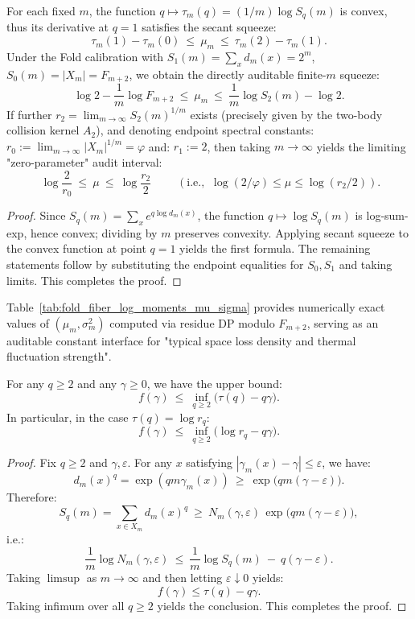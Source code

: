 \begin{corollary}\label{cor:pom-mu-secant-audit}
For each fixed $m$, the function $q\mapsto \tau_m(q)=(1/m)\log S_q(m)$ is convex, thus its derivative at $q=1$ satisfies the secant squeeze:
\[
\boxed{\;
\tau_m(1)-\tau_m(0)\ \le\ \mu_m\ \le\ \tau_m(2)-\tau_m(1).\;}
\]
Under the Fold calibration with $S_1(m)=\sum_x d_m(x)=2^m$, $S_0(m)=|X_m|=F_{m+2}$, we obtain the directly auditable finite-$m$ squeeze:
\[
\boxed{\;
\log2-\frac1m\log F_{m+2}\ \le\ \mu_m\ \le\ \frac1m\log S_2(m)-\log2.\;}
\]
If further $r_2=\lim_{m\to\infty}S_2(m)^{1/m}$ exists (precisely given by the two-body collision kernel $A_2$), and denoting endpoint spectral constants:
\(
r_0:=\lim_{m\to\infty}|X_m|^{1/m}=\varphi
\)
and:
\(
r_1:=2
\),
then taking $m\to\infty$ yields the limiting "zero-parameter" audit interval:
\[
\boxed{\;
\log\frac{2}{r_0}\ \le\ \mu\ \le\ \log\frac{r_2}{2}\;}
\qquad(\text{i.e., }\ \log(2/\varphi)\le\mu\le\log(r_2/2)).
\]
\end{corollary}
\begin{proof}
Since $S_q(m)=\sum_x e^{q\log d_m(x)}$, the function $q\mapsto \log S_q(m)$ is log-sum-exp, hence convex; dividing by $m$ preserves convexity. Applying secant squeeze to the convex function at point $q=1$ yields the first formula. The remaining statements follow by substituting the endpoint equalities for $S_0,S_1$ and taking limits. This completes the proof.
\end{proof}
Table~\ref{tab:fold_fiber_log_moments_mu_sigma} provides numerically exact values of $(\mu_m,\sigma_m^2)$ computed via residue DP modulo $F_{m+2}$, serving as an auditable constant interface for "typical space loss density and thermal fluctuation strength".



\begin{proposition}\label{prop:pom-spectrum-legendre-upper}
For any $q\ge 2$ and any $\gamma\ge 0$, we have the upper bound:
$$
f(\gamma)\ \le\ \inf_{q\ge 2}\bigl(\tau(q)-q\gamma\bigr).
$$
In particular, in the case $\tau(q)=\log r_q$:
$$
f(\gamma)\ \le\ \inf_{q\ge 2}\bigl(\log r_q-q\gamma\bigr).
$$
\end{proposition}

\begin{proof}
Fix $q\ge 2$ and $\gamma,\varepsilon$. For any $x$ satisfying $|\gamma_m(x)-\gamma|\le\varepsilon$, we have:
$$
d_m(x)^q=\exp(qm\gamma_m(x))\ \ge\ \exp\bigl(qm(\gamma-\varepsilon)\bigr).
$$
Therefore:
$$
S_q(m)=\sum_{x\in X_m} d_m(x)^q
\ \ge\ N_m(\gamma,\varepsilon)\,\exp\bigl(qm(\gamma-\varepsilon)\bigr),
$$
i.e.:
$$
\frac{1}{m}\log N_m(\gamma,\varepsilon)\ \le\ \frac{1}{m}\log S_q(m)\ -\ q(\gamma-\varepsilon).
$$
Taking $\limsup$ as $m\to\infty$ and then letting $\varepsilon\downarrow 0$ yields:
$$
f(\gamma)\le \tau(q)-q\gamma.
$$
Taking infimum over all $q\ge 2$ yields the conclusion. This completes the proof.
\end{proof}

